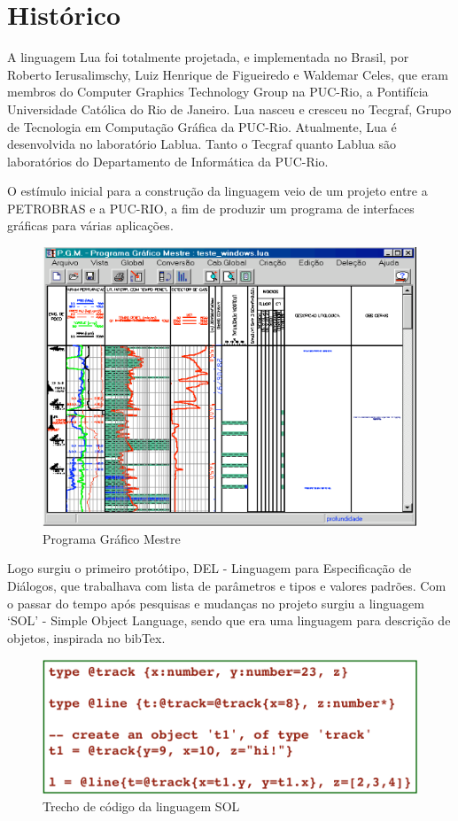 \documentclass[
	12pt,				%
	openright,			%
	twoside,			%
	a4paper,			%
	english,			%
	brazil,				%
	]{abntex2}
\begin{document}


\chapter{Histórico}
A linguagem Lua foi totalmente projetada, e implementada no Brasil, por Roberto Ierusalimschy, Luiz Henrique de Figueiredo e Waldemar Celes, que eram membros do Computer Graphics Technology Group na PUC-Rio, a Pontifícia Universidade Católica do Rio de Janeiro. Lua nasceu e cresceu no Tecgraf, Grupo de Tecnologia em Computação Gráfica da PUC-Rio. Atualmente, Lua é desenvolvida no laboratório Lablua. Tanto o Tecgraf quanto Lablua são laboratórios do Departamento de Informática da PUC-Rio.

O estímulo inicial para a construção da linguagem veio de um projeto entre a PETROBRAS e a PUC-RIO, a fim de produzir um programa de interfaces gráficas para várias aplicações.

\begin{figure}[!htb]
	\centering
	\includegraphics[width=0.5\linewidth]{imagens/imagem1.png}
	\caption{Programa Gráfico Mestre}
\end{figure}

Logo surgiu o primeiro protótipo, DEL - Linguagem para Especificação de Diálogos, que trabalhava com lista de parâmetros e tipos e valores padrões. Com o passar do tempo após pesquisas e mudanças no projeto surgiu a linguagem `SOL' - Simple Object Language, sendo que era uma linguagem para descrição de objetos, inspirada no bibTex.

\begin{figure}[!htb]
	\centering
	\includegraphics[width=0.5\linewidth]{imagens/imagem2.png}
	\caption{Trecho de código da linguagem SOL}
\end{figure}
\end{document}
